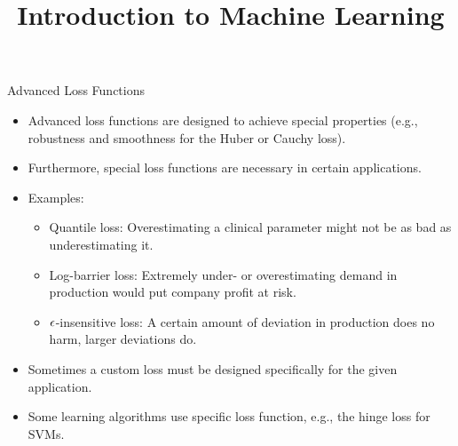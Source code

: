




\newcommand{\titlefigure}{figure_man/optimization_steps.jpeg}
\newcommand{\learninggoals}{
  \item Know the Huber loss
  \item Know the log-barrier loss
  \item Know the $\eps$-insensitive loss
  \item Know the quantile loss
  \item Know the Cauchy loss
}

\title{Introduction to Machine Learning}
\date{}





\begin{vbframe}{Advanced Loss Functions}
\begin{itemize}
\item Advanced loss functions are designed to achieve special properties (e.g., robustness and smoothness for the Huber or Cauchy loss).
\item Furthermore, special loss functions are necessary in certain applications.
\item Examples:
\begin{itemize}
\item Quantile loss: Overestimating a clinical parameter might not be as bad as underestimating it.
\item Log-barrier loss: Extremely under- or overestimating demand in production would put company profit at risk.
\item $\epsilon$-insensitive loss: A certain amount of deviation in production does no harm, larger deviations do.
\end{itemize}
\item Sometimes a custom loss must be designed specifically for the given application.
\item Some learning algorithms use specific loss function, e.g., the hinge loss for SVMs.
\end{itemize}
\end{vbframe}

